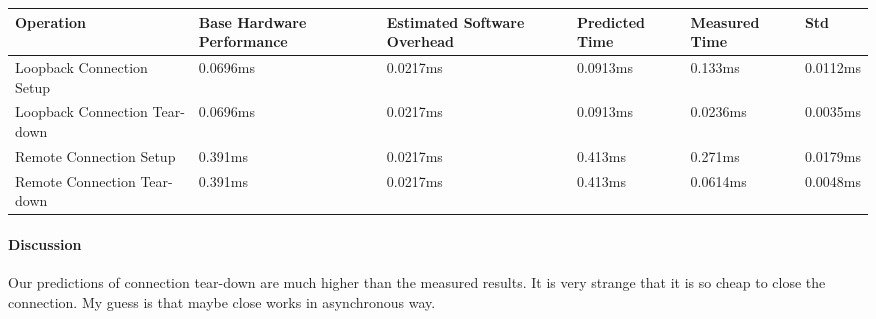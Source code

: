 \begin{center}
\begin{tabular}{| p{3cm} | p{3cm} | p{3cm} | p{2cm} | p{2cm} | p{2cm}}
Operation  & Base Hardware Performance  & Estimated Software Overhead  & Predicted Time  & Measured Time  & Std \\
\hline
Loopback Connection Setup & 0.0696ms & 0.0217ms & 0.0913ms & 0.133ms & 0.0112ms \\
Loopback Connection Tear-down & 0.0696ms & 0.0217ms & 0.0913ms & 0.0236ms & 0.0035ms \\
Remote Connection Setup & 0.391ms & 0.0217ms & 0.413ms & 0.271ms & 0.0179ms \\
Remote Connection Tear-down & 0.391ms & 0.0217ms & 0.413ms & 0.0614ms & 0.0048ms \\
\end{tabular}
\end{center}


\paragraph{Discussion}
Our predictions of connection tear-down are much higher than the measured results. It is very strange that it is so cheap to close the connection.
My guess is that maybe close works in asynchronous way.
